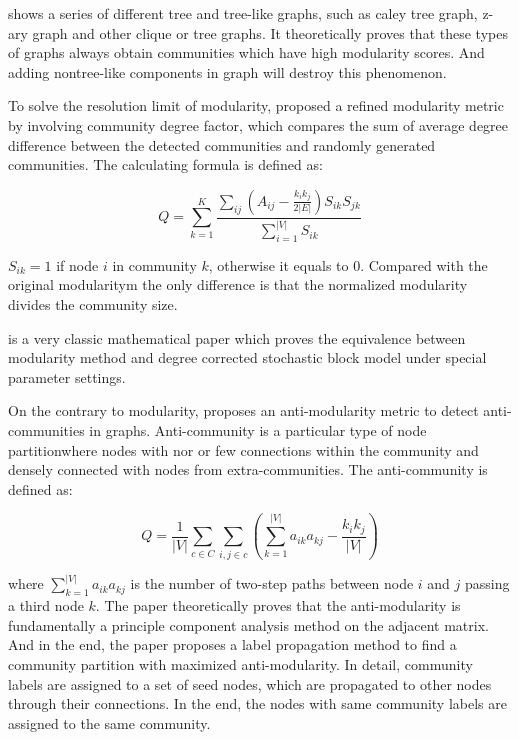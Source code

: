   
\cite{bagrow2012communities} shows a series of different tree and tree-like graphs, such as caley tree graph, z-ary graph and other clique or tree graphs. It theoretically proves that these types of graphs  always obtain communities which have high modularity scores. And adding nontree-like components in graph will destroy this phenomenon. 

To solve the resolution limit of modularity, \cite{zhang2013normalized} proposed a refined modularity metric by involving community degree factor, which compares the sum of average degree difference between the detected communities and randomly generated communities. The calculating formula is defined as:

\begin{equation}
Q = \sum_{k=1}^{K}\frac{\sum_{ij}(A_{ij} - \frac{k_ik_j}{2|E|})S_{ik}S_{jk}}{\sum_{i=1}^{|V|}S_{ik}}
\end{equation}

$S_{ik} = 1$ if node $i$ in community $k$, otherwise it equals to 0. Compared with the original modularitym the only difference is that  the normalized modularity divides the community size.

\cite{newman2016equivalence} is a very classic mathematical paper which proves the equivalence between modularity method and  degree corrected stochastic block model under special parameter settings.

On the contrary to modularity, \cite{chen2014anti} proposes an anti-modularity metric to detect anti-communities in graphs. Anti-community is a particular type of node partitionwhere nodes with nor or few connections within the community and densely connected with nodes from extra-communities. The anti-community is defined as:

\begin{equation}
Q = \frac{1}{|V|}\sum_{c \in C} \sum_{i,j \in c}(\sum_{k=1}^{|V|}a_{ik}a_{kj} -\frac{ k_ik_j }{|V|})
\end{equation}

where $\sum_{k=1}^{|V|}a_{ik}a_{kj}$ is the number of two-step paths between node $i$ and $j$ passing a third node $k$. The paper theoretically proves that the anti-modularity is fundamentally a principle component analysis method on the adjacent matrix. And in the end, the paper proposes a label propagation method to find a community partition with maximized anti-modularity. In detail, community labels are assigned to a set of seed nodes, which are propagated to other nodes through their connections. In the end, the nodes with same community labels are assigned to the same community.


